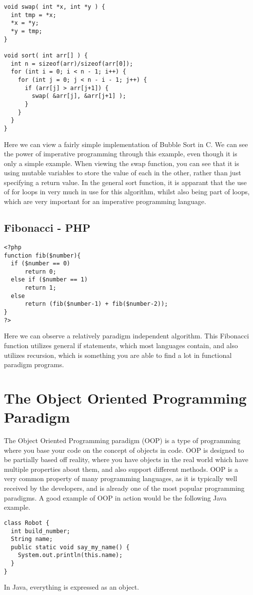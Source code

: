 \documentclass{report}
\begin{document}
\begin{lstlisting}
void swap( int *x, int *y ) {
  int tmp = *x;
  *x = *y;
  *y = tmp;
}

void sort( int arr[] ) {
  int n = sizeof(arr)/sizeof(arr[0]);
  for (int i = 0; i < n - 1; i++) {
    for (int j = 0; j < n - i - 1; j++) {
      if (arr[j] > arr[j+1]) {
        swap( &arr[j], &arr[j+1] );
      }
    }
  }
}
\end{lstlisting}
Here we can view a fairly simple implementation of Bubble Sort in C. We can see the power of imperative programming through this example, even though it is only a simple example. When viewing the swap function, you can see that it is using mutable variables to store the value of each in the other, rather than just specifying a return value. In the general sort function, it is apparant that the use of for loops in very much in use for this algorithm, whilst also being part of loops, which are very important for an imperative programming language.

\subsection{Fibonacci - PHP}

\begin{lstlisting}
<?php
function fib($number){
  if ($number == 0)
      return 0;
  else if ($number == 1)
      return 1;
  else
      return (fib($number-1) + fib($number-2));
}
?>
\end{lstlisting}
Here we can observe a relatively paradigm independent algorithm. This Fibonacci function utilizes general if statements, which most languages contain, and also utilizes recursion, which is something you are able to find a lot in functional paradigm programs.

\section{The Object Oriented Programming Paradigm}
The Object Oriented Programming paradigm (OOP) is a type of programming where you base your code on the concept of objects in code. OOP is designed to be partially based off reality, where you have objects in the real world which have multiple properties about them, and also support different methods. OOP is a very common property of many programming languages, as it is typically well received by the developers, and is already one of the most popular programming paradigms. A good example of OOP in action would be the following Java example.
\begin{lstlisting}
class Robot {
  int build_number;
  String name;
  public static void say_my_name() {
    System.out.println(this.name);
  }
}
\end{lstlisting}
In Java, everything is expressed as an object.
\end{document}
